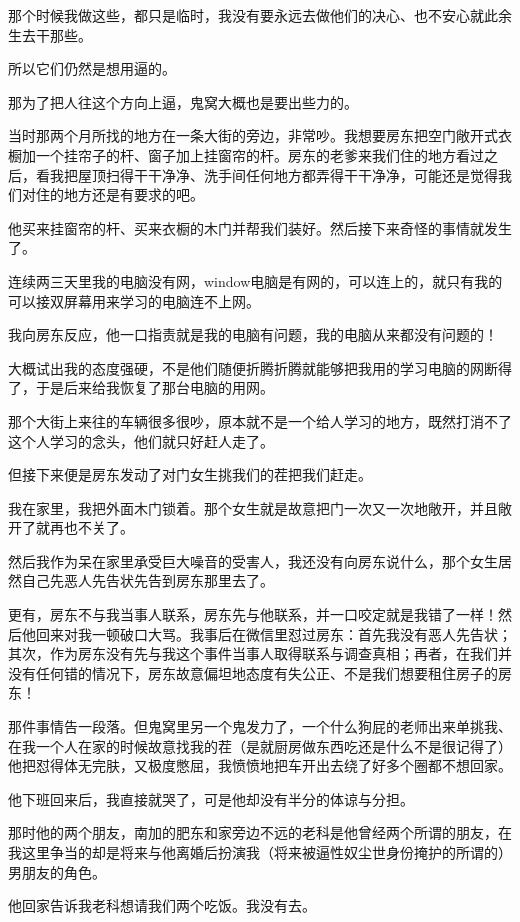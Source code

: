 \documentclass[9pt, b5paper]{article}
\begin{document}
那个时候我做这些，都只是临时，我没有要永远去做他们的决心、也不安心就此余生去干那些。

所以它们仍然是想用逼的。

那为了把人往这个方向上逼，鬼窝大概也是要出些力的。

当时那两个月所找的地方在一条大街的旁边，非常吵。我想要房东把空门敞开式衣橱加一个挂帘子的杆、窗子加上挂窗帘的杆。房东的老爹来我们住的地方看过之后，看我把屋顶扫得干干净净、洗手间任何地方都弄得干干净净，可能还是觉得我们对住的地方还是有要求的吧。

他买来挂窗帘的杆、买来衣橱的木门并帮我们装好。然后接下来奇怪的事情就发生了。

连续两三天里我的电脑没有网，window电脑是有网的，可以连上的，就只有我的可以接双屏幕用来学习的电脑连不上网。

我向房东反应，他一口指责就是我的电脑有问题，我的电脑从来都没有问题的！

大概试出我的态度强硬，不是他们随便折腾折腾就能够把我用的学习电脑的网断得了，于是后来给我恢复了那台电脑的用网。

那个大街上来往的车辆很多很吵，原本就不是一个给人学习的地方，既然打消不了这个人学习的念头，他们就只好赶人走了。 

但接下来便是房东发动了对门女生挑我们的茬把我们赶走。

我在家里，我把外面木门锁着。那个女生就是故意把门一次又一次地敞开，并且敞开了就再也不关了。

然后我作为呆在家里承受巨大噪音的受害人，我还没有向房东说什么，那个女生居然自己先恶人先告状先告到房东那里去了。

更有，房东不与我当事人联系，房东先与他联系，并一口咬定就是我错了一样！然后他回来对我一顿破口大骂。我事后在微信里怼过房东：首先我没有恶人先告状；其次，作为房东没有先与我这个事件当事人取得联系与调查真相；再者，在我们并没有任何错的情况下，房东故意偏坦地态度有失公正、不是我们想要租住房子的房东！

那件事情告一段落。但鬼窝里另一个鬼发力了，一个什么狗屁的老师出来单挑我、在我一个人在家的时候故意找我的茬（是就厨房做东西吃还是什么不是很记得了）他把怼得体无完肤，又极度憋屈，我愤愤地把车开出去绕了好多个圈都不想回家。

他下班回来后，我直接就哭了，可是他却没有半分的体谅与分担。

那时他的两个朋友，南加的肥东和家旁边不远的老科是他曾经两个所谓的朋友，在我这里争当的却是将来与他离婚后扮演我（将来被逼性奴尘世身份掩护的所谓的）男朋友的角色。

他回家告诉我老科想请我们两个吃饭。我没有去。
\end{document}

